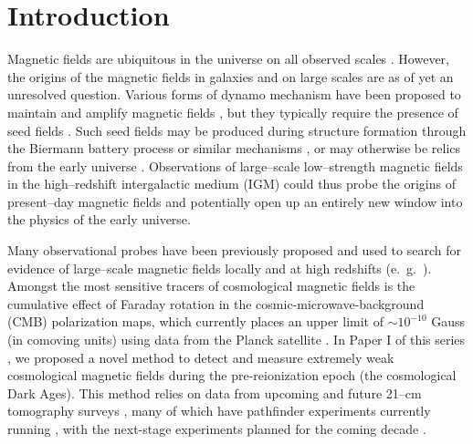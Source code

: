 \section{Introduction}
\label{sec:intro}

Magnetic fields are ubiquitous in the universe on all observed scales \cite{2013A&ARv..21...62D,Vallee04,Neronov10,2005LNP...664...89W,2012SSRv..166..215B}. However, the origins of the magnetic fields in galaxies and on large scales are as of yet an unresolved question. Various forms of dynamo mechanism have been proposed to maintain and amplify magnetic fields \cite{2013PhRvE..87e3110P}, but they typically require the presence of seed fields \cite{2013A&ARv..21...62D}. Such seed fields may be produced during structure formation through the Biermann battery process or similar mechanisms \cite{Naoz13,2013PhRvL.111e1303N}, or may otherwise be relics from the early universe \cite{2013A&ARv..21...62D,2012SSRv..166...37W,2014JCAP...05..040K}. Observations of large--scale low--strength magnetic fields in the high--redshift intergalactic medium (IGM) could thus probe the origins of present--day magnetic fields and potentially open up an entirely new window into the physics of the early universe.

Many observational probes have been previously proposed and used to search for evidence of large--scale magnetic fields locally and at high redshifts (e.~g.~\cite{Yamazaki10,Blasi99,Tavecchio10,Dolag11,2005LNP...664...89W,2014JCAP...01..009K,2013ApJ...770...47K,2014PhRvD..89j3522S,2006MNRAS.372.1060T,2009ApJ...692..236S}). Amongst the most sensitive tracers of cosmological magnetic fields is the cumulative effect of Faraday rotation in the cosmic-microwave-background (CMB) polarization maps, which currently places an upper limit of $\sim$$10^{-10}$ Gauss (in comoving units) using data from the Planck satellite \cite{2015arXiv150201594P}. In Paper I of this series \cite{2014arXiv1410.2250V}, we proposed a novel method to detect and measure extremely weak cosmological magnetic fields during the pre-reionization epoch (the cosmological Dark Ages). This method relies on data from upcoming and future 21--cm tomography surveys \cite{1997ApJ...475..429M,2004PhRvL..92u1301L}, many of which have pathfinder experiments currently running \cite{2012arXiv1201.1700G,2011AAS...21813206B,2014ApJ...788..106P,2008arXiv0802.1727C,Vanderlinde14,2015AAS...22532803D}, with the next-stage experiments planned for the coming decade \cite{2008arXiv0802.1727C,2015AAS...22532803D}. 

